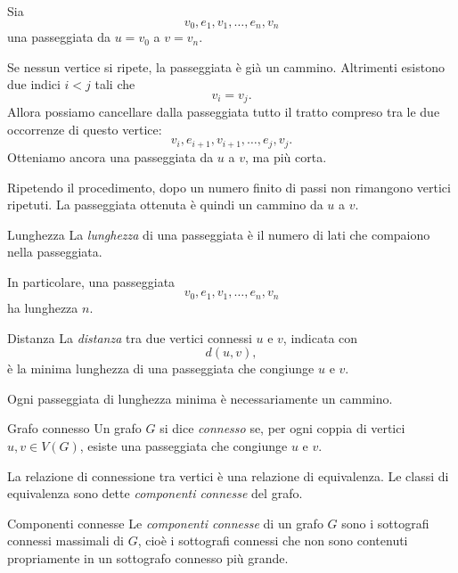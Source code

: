\documentclass[a4paper]{article}
\begin{document}
\begin{snippetproof}{}
    Sia
    \[
        v_0,e_1,v_1,\ldots,e_n,v_n
    \]
    una passeggiata da \(u=v_0\) a \(v=v_n\).

    Se nessun vertice si ripete, la passeggiata è già un cammino. Altrimenti esistono due indici \(i<j\) tali che
    \[
        v_i=v_j.
    \]
    Allora possiamo cancellare dalla passeggiata tutto il tratto compreso tra le due occorrenze di questo vertice:
    \[
        v_i,e_{i+1},v_{i+1},\ldots,e_j,v_j.
    \]
    Otteniamo ancora una passeggiata da \(u\) a \(v\), ma più corta.

    Ripetendo il procedimento, dopo un numero finito di passi non rimangono vertici ripetuti. La passeggiata ottenuta è quindi un cammino da \(u\) a \(v\).
\end{snippetproof}

\begin{snippetdefinition}{Lunghezza}
    La \emph{lunghezza} di una passeggiata è il numero di lati che compaiono nella passeggiata.

    In particolare, una passeggiata
    \[
        v_0,e_1,v_1,\ldots,e_n,v_n
    \]
    ha lunghezza \(n\).
\end{snippetdefinition}

\begin{snippetdefinition}{Distanza}
    La \emph{distanza} tra due vertici connessi \(u\) e \(v\), indicata con
    \[
        d(u,v),
    \]
    è la minima lunghezza di una passeggiata che congiunge \(u\) e \(v\).

    Ogni passeggiata di lunghezza minima è necessariamente un cammino.
\end{snippetdefinition}

\begin{snippetdefinition}{Grafo connesso}
    Un grafo \(G\) si dice \emph{connesso} se, per ogni coppia di vertici \(u,v\in V(G)\), esiste una passeggiata che congiunge \(u\) e \(v\).
\end{snippetdefinition}

La relazione di connessione tra vertici è una relazione di equivalenza. Le classi di equivalenza sono dette \emph{componenti connesse} del grafo.

\begin{snippetdefinition}{Componenti connesse}
    Le \emph{componenti connesse} di un grafo \(G\) sono i sottografi connessi massimali di \(G\), cioè i sottografi connessi che non sono contenuti propriamente in un sottografo connesso più grande.
\end{snippetdefinition}
\end{document}
